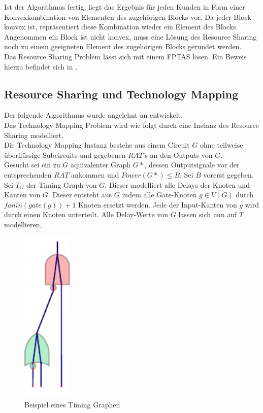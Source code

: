 \documentclass[11pt, a4paper, german]{article}
\newcommand{\TM}{Technology  Mapping }
\begin{document}
Ist der Algorithmus fertig, liegt das Ergebnis für jeden Kunden in Form einer Konvexkombination von Elementen des zugehörigen Blocks vor. Da jeder Block konvex ist, repräsentiert diese Kombination wieder ein Element des Blocks. \\
Angenommen ein Block ist nicht konvex, muss eine Lösung des Resource Sharing noch zu einem geeigneten Element des zugehörigen Blocks gerundet werden.\\

Das Resource Sharing Problem lässt sich mit einem FPTAS lösen. Ein Beweis hierzu befindet sich in \cite{Vygen2011}.

\subsection{Resource Sharing und \TM}
Der folgende Algorithmus wurde angelehnt an \cite{Daboul2018} entwickelt.\\
Das \TM Problem wird wie folgt durch eine Instanz des Resource Sharing modelliert.\\
Die \TM Instanz bestehe aus einem Circuit $G$ ohne teilweise überflüssige Subcircuits und gegebenen $RAT$'s an den Outputs von $G$. \\
Gesucht sei ein zu $G$ äquivalenter Graph $G*$, dessen Outputsignale vor der entsprechenden $RAT$ ankommen und $Power(G*) \leq B$. Sei $B$ vorerst gegeben. \\
Sei $T_G$ der Timing Graph von $G$. Dieser modelliert alle Delays der Knoten und Kanten von $G$. 
Dieser entsteht aus $G$ indem alle Gate-Knoten $g \in V(G)$ durch $fanin(gate(g)) +1$ Knoten ersetzt werden. Jede der Input-Kanten von $g$ wird durch einen Knoten unterteilt.  Alle Delay-Werte von $G$ lassen sich nun auf $T$ modellieren, 
   \begin{figure}
		\includegraphics[width = 2.4cm]{pictures/compiled/timing_graph}
		\caption{Beispiel eines Timing Graphen}
		\label{bild:timing_graph}
	\end{figure}
\end{document}
